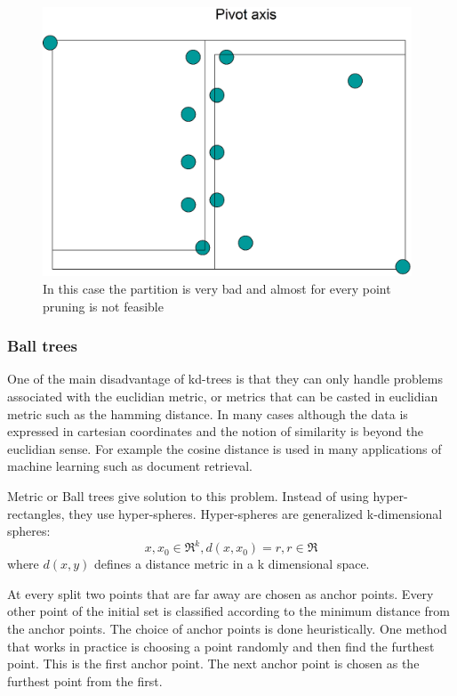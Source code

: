 \documentclass[12pt,letterpaper,doublespaced,ETD,dvips,proposal]{gtthesis}
\begin{document}
\begin{Body}
\begin{figure}[!htb]
\label{pathological_kd_tree}
\centerline{\includegraphics[height=8cm]{pathological_kd_tree.eps}}
\caption{In this case the partition is very bad and almost for every point pruning is not
feasible}
\end{figure}




\subsubsection{Ball trees}
One of the main disadvantage of kd-trees is that they can only
handle problems associated with the euclidian metric, or metrics
that can be casted in euclidian metric such as the hamming distance.
In many cases although the data is expressed in cartesian
coordinates and the notion of similarity is beyond the euclidian sense.
For example the cosine distance is used in many applications of
machine learning such as document retrieval.

Metric or Ball trees \cite{moore2000ahu} give solution to this problem. Instead of using
hyper-rectangles, they use hyper-spheres. Hyper-spheres are
generalized k-dimensional spheres:
\begin{equation}
x,x_0 \in \Re^k , d(x,x_0)=r, r\in \Re
\end{equation}
where $d(x, y)$ defines a distance metric in a k dimensional space.

At every split two points that are far away are chosen as anchor
points. Every other point of the initial set is classified according
to the minimum distance from the anchor points. The choice of anchor
points is done heuristically. One method that works in practice is
choosing a point randomly and then find the furthest point. This is
the first anchor point. The next anchor point is chosen as the
furthest point from the first.


\end{Body}
\end{document}
